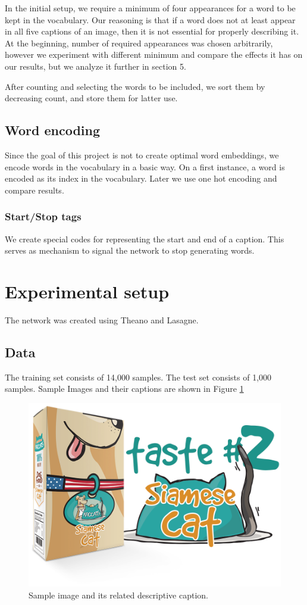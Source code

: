 \documentclass{article}
\begin{document}
In the initial setup, we require a minimum of four appearances for a word to be kept in the vocabulary. Our reasoning is that if a word does not at least appear in all five captions of an image, then it is not essential for properly describing it. At the beginning, number of required appearances was chosen arbitrarily, however we experiment with different minimum and compare the effects it has on our results, but we analyze it further in section 5.

After counting and selecting the words to be included, we sort them by decreasing count, and store them for latter use.

\subsection{Word encoding}
Since the goal of this project is not to create optimal word embeddings, we encode words in the vocabulary in a basic way.
On a first instance, a word is encoded as its index in the vocabulary. Later we use one hot encoding and compare results. 

\subsubsection{Start/Stop tags} 
We create special codes for representing the start and end of a caption. This serves as mechanism to signal the network to stop generating words.

\section{Experimental setup}
The network was created using Theano and Lasagne.

\subsection{Data}
The training set consists of 14,000 samples. The test set consists of 1,000 samples. Sample Images and their captions are shown in Figure \ref{fig:sample_input}

\begin{figure}[H]
  \centering
  \includegraphics[width=.36\linewidth]{./images/sample_input.png}
  \caption{Sample image and its related descriptive caption.}
  \label{fig:sample_input}
\end{figure}
\end{document}

